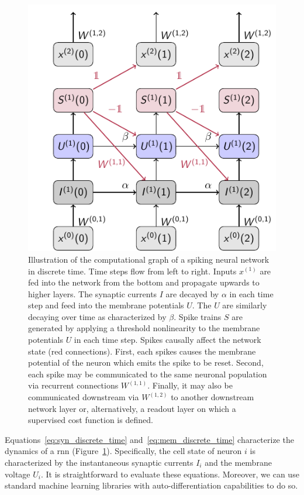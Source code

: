 \documentclass[journal,onecolumn,11pt]{IEEEtran}
\begin{document}
\begin{figure}
    \centering
    \includegraphics{figures/snn_graph.pdf}
	\caption{Illustration of the computational graph of a spiking neural network
  in discrete time. Time steps flow from left to right. Inputs $x^{(1)}$ are fed
	into the network from the bottom and propagate upwards to higher layers. The
	synaptic currents $I$ are decayed by $\alpha$ in each time step and feed
	into the membrane potentials $U$. The $U$ are similarly decaying over time
	as characterized by $\beta$. Spike trains $S$ are generated by applying a
	threshold nonlinearity to the membrane potentials $U$ in each time step.
	Spikes causally affect the network state (red connections).  First, each
	spikes causes the membrane potential of the neuron which emits the spike to
	be reset. Second, each spike may be communicated to the same neuronal
	population via recurrent connections $W^{(1,1)}$.  Finally, it may also be
	communicated downstream via $W^{(1,2)}$ to another downstream network layer
	or, alternatively, a readout layer on which a supervised cost function is
	defined.}
    \label{fig:snn_computational_graph}
\end{figure}

Equations~\eqref{eq:syn_discrete_time} and~\eqref{eq:mem_discrete_time}
characterize the dynamics of a \gls{rnn}
(Figure~\ref{fig:snn_computational_graph}).  Specifically, the cell state of
neuron $i$ is characterized by the instantaneous synaptic currents $I_i$ and the
membrane voltage $U_i$.  
It is straightforward to evaluate these equations. Moreover, we can use
standard machine learning libraries with auto-differentiation capabilities to do so.
\end{document}
